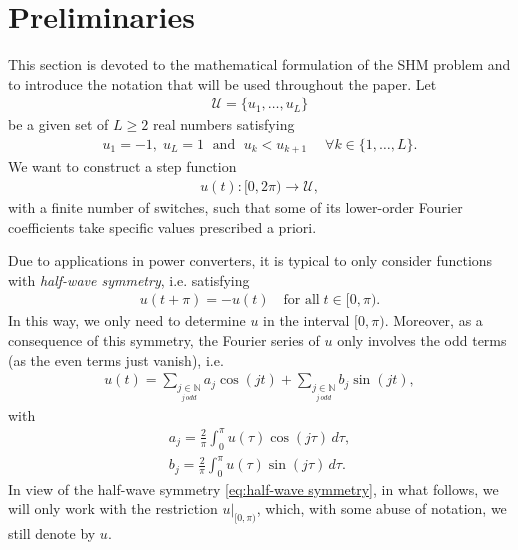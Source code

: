 \documentclass[twocolumn]{autart}    %
\begin{document}
\section{Preliminaries}\label{sec:math_formulation}

This section is devoted to the mathematical formulation of the SHM problem and to introduce the notation that will be used throughout the paper. Let 
\begin{align}\label{eq:Udef}
	\mathcal{U} = \{u_1, \ldots, u_L\}
\end{align}
be a given set of $L\geq 2$ real numbers satisfying
\begin{align*}
	u_1 = -1, \; u_L = 1 \;\text{ and } \; u_k<u_{k+1} \quad\; \forall k\in \{1,\ldots, L\}.
\end{align*}
We want to construct a step function
\begin{align*}
	u(t):[0,2\pi)\to\mathcal U,
\end{align*}
with a finite number of switches, such that some of its lower-order Fourier coefficients take specific values prescribed a priori.

Due to applications in power converters,  it is typical to only consider functions with \textit{half-wave symmetry}, i.e. satisfying
\begin{align}\label{eq:half-wave symmetry}
	u(t + \pi) = -u(t)\quad \mbox{for all}\; t \in [0,\pi).
\end{align}
In this way, we only need to determine $u$ in the interval $[0,\pi)$. Moreover, as a consequence of this symmetry, the Fourier series of $u$ only involves the odd terms (as the even terms just vanish), i.e.
\begin{align*}
	u(t) = \sum_{\underset{j\, odd}{j \in \mathbb{N}}} a_j \cos(jt)+ \sum_{\underset{j\, odd}{j \in \mathbb{N}}}  b_j \sin(jt),
\end{align*}
with
\begin{equation} \label{eq:an}
	\begin{aligned}
		a_j = \frac{2}{\pi} \int_0^\pi u(\tau ) \cos(j \tau)\,d\tau, 
		\\[5pt]
		b_j = \frac{2}{\pi} \int_0^\pi u(\tau)  \sin(j \tau)\,d\tau.
	\end{aligned}
\end{equation}
In view of the half-wave symmetry \eqref{eq:half-wave symmetry}, in what follows, we will only work with the restriction $u|_{[0,\pi)}$, which, with some abuse of notation, we still denote by $u$. 
\end{document}
